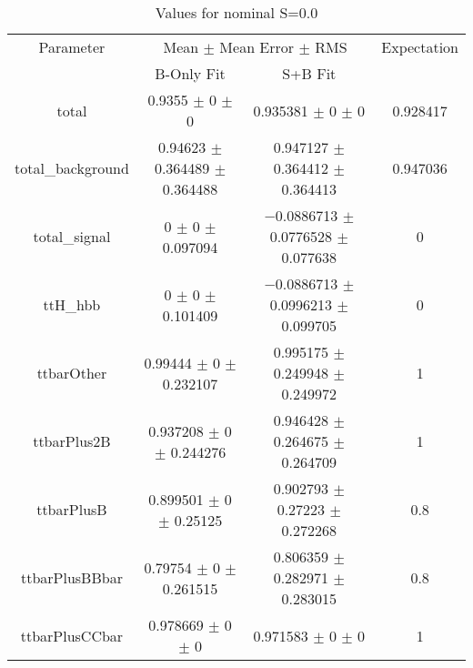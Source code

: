 \begin{table}
\centering
\caption{Values for nominal S=0.0}
\begin{tabular}{cccc}
\toprule
Parameter & \multicolumn{2}{c}{Mean $\pm$ Mean Error $\pm$ RMS} & Expectation\\
 & B-Only Fit & S+B Fit & \\
\midrule
total & \num{0.9355} $\pm$ \num{0} $\pm$ \num{0} & \num{0.935381} $\pm$ \num{0} $\pm$ \num{0} & \num{0.928417}\\
total\_background & \num{0.94623} $\pm$ \num{0.364489} $\pm$ \num{0.364488} & \num{0.947127} $\pm$ \num{0.364412} $\pm$ \num{0.364413} & \num{0.947036}\\
total\_signal & \num{0} $\pm$ \num{0} $\pm$ \num{0.097094} & \num{-0.0886713} $\pm$ \num{0.0776528} $\pm$ \num{0.077638} & \num{0}\\
ttH\_hbb & \num{0} $\pm$ \num{0} $\pm$ \num{0.101409} & \num{-0.0886713} $\pm$ \num{0.0996213} $\pm$ \num{0.099705} & \num{0}\\
ttbarOther & \num{0.99444} $\pm$ \num{0} $\pm$ \num{0.232107} & \num{0.995175} $\pm$ \num{0.249948} $\pm$ \num{0.249972} & \num{1}\\
ttbarPlus2B & \num{0.937208} $\pm$ \num{0} $\pm$ \num{0.244276} & \num{0.946428} $\pm$ \num{0.264675} $\pm$ \num{0.264709} & \num{1}\\
ttbarPlusB & \num{0.899501} $\pm$ \num{0} $\pm$ \num{0.25125} & \num{0.902793} $\pm$ \num{0.27223} $\pm$ \num{0.272268} & \num{0.8}\\
ttbarPlusBBbar & \num{0.79754} $\pm$ \num{0} $\pm$ \num{0.261515} & \num{0.806359} $\pm$ \num{0.282971} $\pm$ \num{0.283015} & \num{0.8}\\
ttbarPlusCCbar & \num{0.978669} $\pm$ \num{0} $\pm$ \num{0} & \num{0.971583} $\pm$ \num{0} $\pm$ \num{0} & \num{1}\\
\bottomrule
\end{tabular}
\end{table}